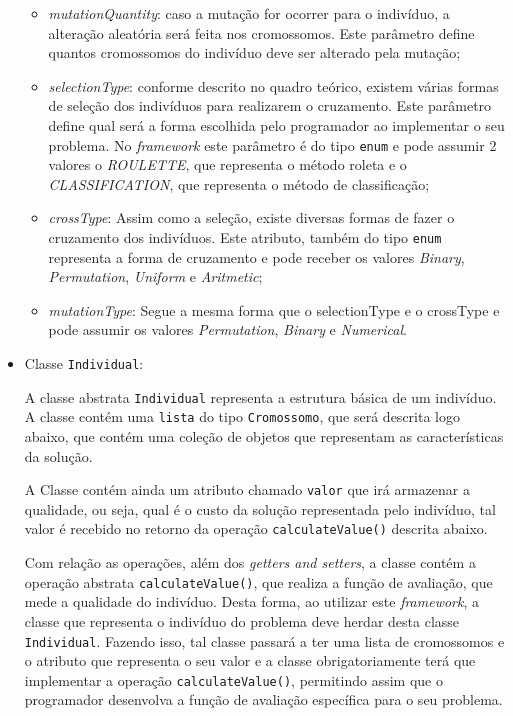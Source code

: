 \begin{itemize}
\begin{itemize}
		\item \textit{mutationQuantity}:
		caso a mutação for ocorrer para o indivíduo, a alteração aleatória será feita
		nos cromossomos.
		Este parâmetro define quantos cromossomos do indivíduo deve ser alterado pela mutação;
		
		\item \textit{selectionType}:
		conforme descrito no quadro teórico, existem várias formas de seleção dos
		indivíduos para realizarem o cruzamento. Este parâmetro define qual será a forma escolhida pelo programador ao implementar o seu problema. 
		No \textit{framework} este parâmetro é do tipo \texttt{enum} e pode assumir 2 valores o \textit{ROULETTE}, 
		que representa o método roleta e o \textit{CLASSIFICATION}, que representa o método de classificação;
		
		\item \textit{crossType}:
		Assim como a seleção, existe diversas formas de fazer o cruzamento dos indivíduos. Este atributo, 
		também do tipo \texttt{enum} representa a forma de cruzamento e pode receber os valores \textit{Binary}, 
		\textit{Permutation}, \textit{Uniform} e \textit{Aritmetic};
		
		\item \textit{mutationType}:
		Segue a mesma forma que o selectionType e o crossType e pode assumir os valores \textit{Permutation}, 
		\textit{Binary} e \textit{Numerical}.
		
	\end{itemize}
	
	\item Classe \texttt{Individual}:
	\par A classe abstrata \texttt{Individual} representa a estrutura básica de um indivíduo. 
	A classe contém uma \texttt{lista} do tipo 
	\texttt{Cromossomo}, que será descrita logo abaixo, que contém uma coleção de
	objetos que representam as características da solução.
	
	\par A Classe contém ainda um atributo chamado \texttt{valor} que irá armazenar a qualidade, ou seja, qual é o custo
	da solução representada pelo indivíduo, tal valor é recebido no retorno da
	operação \texttt{calculateValue()} descrita abaixo.
	
	\par Com relação as operações, além dos \textit{getters and setters}, a classe contém a operação abstrata 
	\texttt{calculateValue()}, que realiza a função de avaliação, que mede a qualidade do indivíduo. Desta forma, ao utilizar este \textit{framework}, a classe que representa o indivíduo do 
	problema deve herdar desta classe  \texttt{Individual}. Fazendo isso, tal classe passará a ter uma lista de cromossomos 
	e o atributo que representa o seu valor e a classe obrigatoriamente terá que implementar a operação 
	\texttt{calculateValue()}, permitindo assim que o programador 
	desenvolva a função de avaliação específica para o seu problema.
	

\end{itemize}
